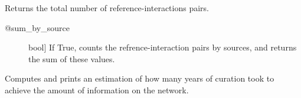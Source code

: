 \documentclass[letterpaper,10pt,english]{sphinxmanual}
\begin{document}
\begin{fulllineitems}
\begin{fulllineitems}
\begin{quote}
\begin{description}
\end{description}\end{quote}

\end{fulllineitems}


\begin{fulllineitems}
\label{\detokenize{main:pypath.main.PyPath.curation_effort}}
Returns the total number of reference-interactions pairs.
\begin{description}
\item[{@sum\_by\_source}] \leavevmode{[}bool{]}
If True, counts the refrence-interaction pairs by
sources, and returns the sum of these values.

\end{description}

\end{fulllineitems}


\begin{fulllineitems}
\label{\detokenize{main:pypath.main.PyPath.curation_stats}}
\end{fulllineitems}


\begin{fulllineitems}
\label{\detokenize{main:pypath.main.PyPath.curation_tab}}
\end{fulllineitems}


\begin{fulllineitems}
\label{\detokenize{main:pypath.main.PyPath.curators_work}}
Computes and prints an estimation of how many years of curation
took to achieve the amount of information on the network.

\end{fulllineitems}


\end{fulllineitems}
\end{document}
